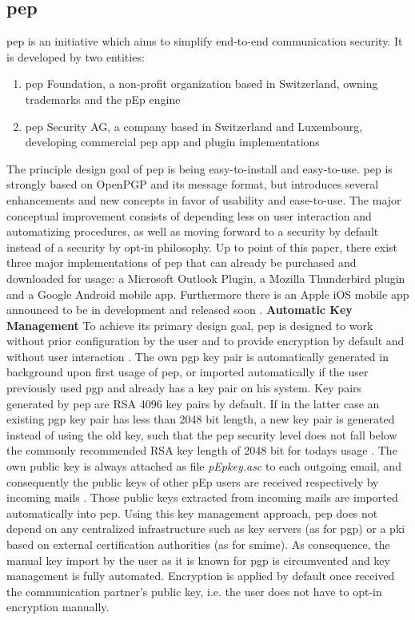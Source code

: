 \subsection{\acrlong{pep}}
\label{chap:analysis-pep}
\acrfull{pep} is an initiative which aims to simplify end-to-end communication security. It is developed by two entities:
\begin{enumerate}
	\item \acrshort{pep} Foundation, a non-profit organization based in Switzerland, owning trademarks and the pEp engine
	\item \acrshort{pep} Security AG, a company based in Switzerland and Luxembourg, developing commercial \acrshort{pep} app and plugin implementations
\end{enumerate}
The principle design goal of \acrshort{pep} is being easy-to-install and easy-to-use. \acrshort{pep} is strongly based on OpenPGP and its message format, but introduces several enhancements and new concepts in favor of usability and ease-to-use. The major conceptual improvement consists of depending less on user interaction and automatizing procedures, as well as moving forward to a security by
default instead of a security by opt-in philosophy. Up to point of this paper, there exist three major implementations of \acrshort{pep} that can already be
purchased and downloaded for usage: a Microsoft Outlook Plugin, a Mozilla Thunderbird plugin and a Google Android mobile app. Furthermore there is an Apple iOS mobile app announced to be in development and released soon \cite{15}.
\newline
\newline
\textbf{Automatic Key Management}\newline
To achieve its primary design goal, \acrshort{pep} is designed to work without prior configuration by the user and to provide encryption by default and without user interaction \cite{15}. The own \acrshort{pgp} key pair is automatically generated in background upon first usage of \acrshort{pep}, or imported automatically if the user previously used \acrshort{pgp} and already has a key pair on his system. Key pairs generated by \acrshort{pep} are RSA 4096 key pairs by default. If in the latter case an existing \acrshort{pgp} key pair has less than 2048 bit length, a new key pair is generated instead of using the old key, such that the \acrshort{pep} security level does not fall below the commonly recommended RSA key length of 2048 bit for todays usage \cite{16}.
The own public key is always attached as file \emph{pEpkey.asc} to each outgoing email, and consequently the public keys of other pEp users are received respectively by incoming mails \cite{16}. Those public keys extracted from incoming mails are imported automatically into \acrshort{pep}. Using this key management approach, \acrshort{pep} does not depend on any centralized infrastructure such as key servers (as for \acrshort{pgp}) or a \acrshort{pki} based on external certification authorities (as for \acrshort{smime}). As consequence, the manual key import by the user as it is known for \acrshort{pgp} is circumvented and key management is fully automated. Encryption is applied by default once received the communication partner's public key, i.e. the user does not have to opt-in encryption manually.
